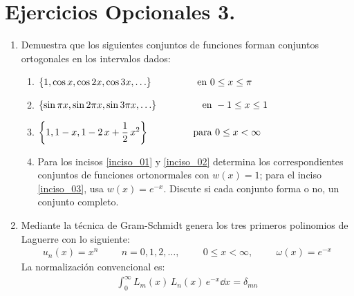\section{Ejercicios Opcionales 3.}
\begin{enumerate}
\item Demuestra que los siguientes conjuntos de funciones forman conjuntos ortogonales en los intervalos dados:
\begin{enumerate}
\item $\left\{ 1, \cos x, \cos 2 x, \cos 3 x, \ldots\right\}  \hspace{1.5cm} \mbox{ en } 0 \leq x \leq \pi$\label{inciso_01}
\item $\left\{ \sin \pi x, \sin 2 \pi x, \sin 3 \pi x, \ldots \right\} \hspace{1.5cm} \mbox{ en } -1 \leq x \leq 1$\label{inciso_02}
\item $\left\{ 1, 1 - x, 1 - 2 \, x + \dfrac{1}{2} \, x^{2} \right\} \hspace{1.5cm} \mbox{ para } 0 \leq x < \infty$\label{inciso_03}
\item Para los incisos \ref{inciso_01} y \ref{inciso_02} determina los correspondientes conjuntos de funciones ortonormales con $w(x) = 1$; para el inciso \ref{inciso_03}, usa $w(x) = e^{-x}$. Discute si cada conjunto forma o no, un conjunto completo.
\end{enumerate}
\item Mediante la técnica de Gram-Schmidt genera los tres primeros polinomios de Laguerre con lo siguiente:
\begin{align*}
u_{n}(x) = x^{n} \hspace{1cm} n = 0, 1, 2, \ldots, \hspace{1cm} 0 \leq x < \infty, \hspace{1cm} \omega(x) = e^{-x}
\end{align*}
La normalización convencional es:
\begin{align*}
\int_{0}^{\infty} L_{m}(x) \, L_{n}(x) \, e^{-x} \dd{x} = \delta_{mn}
\end{align*}
\end{enumerate}
